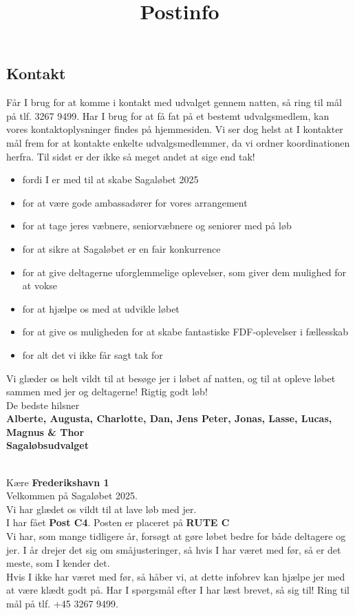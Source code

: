 \subsection{Kontakt}
Får I brug for at komme i kontakt med udvalget gennem natten, så ring til mål på tlf. 3267 9499. Har I brug for at få fat på et bestemt udvalgsmedlem, kan vores kontaktoplysninger findes på hjemmesiden. Vi ser dog helst at I kontakter mål frem for at kontakte enkelte udvalgsmedlemmer, da vi ordner koordinationen herfra.
\newline
Til sidst er der ikke så meget andet at sige end tak!\begin{itemize}
  \item fordi I er med til at skabe Sagaløbet 2025
  \item for at være gode ambassadører for vores arrangement
  \item for at tage jeres væbnere, seniorvæbnere og seniorer med på løb
  \item for at sikre at Sagaløbet er en fair konkurrence
  \item for at give deltagerne uforglemmelige oplevelser, som giver dem mulighed for at vokse
  \item for at hjælpe os med at udvikle løbet
  \item for at give os muligheden for at skabe fantastiske FDF-oplevelser i fællesskab
  \item for alt det vi ikke får sagt tak for
\end{itemize}
Vi glæder os helt vildt til at besøge jer i løbet af natten, og til at opleve løbet sammen med jer og deltagerne!
\newline
Rigtig godt løb!\\
\newline
\textcolor{søblå}{De bedste hilsner}\\
\textcolor{natblå}{\textbf{Alberte, Augusta, Charlotte, Dan, Jens Peter, Jonas, Lasse, Lucas, Magnus \& Thor}}\\
\textcolor{natblå}{\textbf{Sagaløbsudvalget}}\\
\newpage
\title{Postinfo}\\
Kære \textbf{Frederikshavn 1}\\
\newline
Velkommen på Sagaløbet 2025.\\
Vi har glædet os vildt til at lave løb med jer.\\
\newline
I har fået \textbf{Post C4}. Posten er placeret på \textbf{RUTE C}\\
Vi har, som mange tidligere år, forsøgt at gøre løbet bedre for både deltagere og jer. I år drejer det sig om småjusteringer, så hvis I har været med før, så er det meste, som I kender det.\\
\newline
Hvis I ikke har været med før, så håber vi, at dette infobrev kan hjælpe jer med at være klædt godt på. Har I spørgsmål efter I har læst brevet, så sig til! Ring til mål på tlf. +45 3267 9499.
